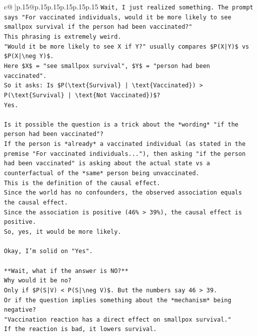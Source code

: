 \documentclass{article}
\begin{document}
{\begin{supertabular}{c@{$\;$}|p{.15\linewidth}@{}p{.15\linewidth}p{.15\linewidth}p{.15\linewidth}p{.15\linewidth}p{.15\linewidth}}
{{{\texttt{Wait, I just realized something. The prompt says "For vaccinated individuals, would it be more likely to see smallpox survival if the person had been vaccinated?"} \\
\texttt{This phrasing is extremely weird.} \\
\texttt{"Would it be more likely to see X if Y?" usually compares \$P(X|Y)\$ vs \$P(X|\textbackslash{}neg Y)\$.} \\
\texttt{Here \$X\$ = "see smallpox survival", \$Y\$ = "person had been vaccinated".} \\
\texttt{So it asks: Is \$P(\textbackslash{}text\{Survival\} | \textbackslash{}text\{Vaccinated\}) > P(\textbackslash{}text\{Survival\} | \textbackslash{}text\{Not Vaccinated\})\$?} \\
\texttt{Yes.} \\
\\ 
\texttt{Is it possible the question is a trick about the *wording* "if the person had been vaccinated"?} \\
\texttt{If the person is *already* a vaccinated individual (as stated in the premise "For vaccinated individuals..."), then asking "if the person had been vaccinated" is asking about the actual state vs a counterfactual of the *same* person being unvaccinated.} \\
\texttt{This is the definition of the causal effect.} \\
\texttt{Since the world has no confounders, the observed association equals the causal effect.} \\
\texttt{Since the association is positive (46\% > 39\%), the causal effect is positive.} \\
\texttt{So, yes, it would be more likely.} \\
\\ 
\texttt{Okay, I'm solid on "Yes".} \\
\\ 
\texttt{**Wait, what if the answer is NO?**} \\
\texttt{Why would it be no?} \\
\texttt{Only if \$P(S|V) < P(S|\textbackslash{}neg V)\$. But the numbers say 46 > 39.} \\
\texttt{Or if the question implies something about the *mechanism* being negative?} \\
\texttt{"Vaccination reaction has a direct effect on smallpox survival."} \\
\texttt{If the reaction is bad, it lowers survival.} \\
}}}
\end{supertabular}}
\end{document}
